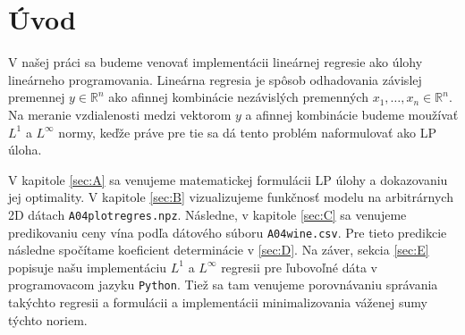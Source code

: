 \documentclass[report.tex]{subfiles}
\begin{document}
	
	\section{Úvod}	
	
	V našej práci sa budeme venovať implementácii lineárnej regresie ako úlohy lineárneho programovania. Lineárna regresia je spôsob odhadovania závislej premennej $y \in \mathbb{R}^n$ ako afinnej kombinácie nezávislých premenných $x_1,\dots,x_n \in \mathbb{R}^n$. Na meranie vzdialenosti medzi vektorom $y$ a afinnej kombinácie budeme moužívať $L^1$ a $L^{\infty}$ normy, keďže práve pre tie sa dá tento problém naformulovať ako LP úloha.
	
	V kapitole \ref{sec:A} sa venujeme matematickej formulácii LP úlohy a dokazovaniu jej optimality. V kapitole \ref{sec:B} vizualizujeme funkčnosť modelu na arbitrárnych 2D dátach \verb|A04plotregres.npz|. Následne, v kapitole \ref{sec:C} sa venujeme predikovaniu ceny vína podľa dátového súboru \verb|A04wine.csv|. Pre tieto predikcie následne spočítame koeficient determinácie v \ref{sec:D}. Na záver, sekcia \ref{sec:E} popisuje našu implementáciu $L^1$ a $L^{\infty}$ regresii pre ľubovoľné dáta v programovacom jazyku \verb|Python|. Tiež sa tam venujeme porovnávaniu správania takýchto regresii a formulácii a implementácii minimalizovania váženej sumy týchto noriem.
	
\end{document}
